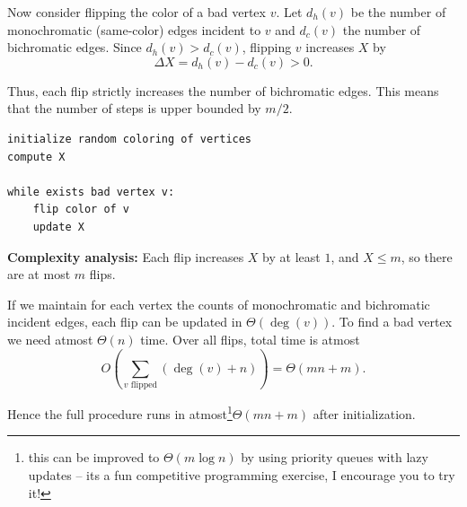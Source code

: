 Now consider flipping the color of a bad vertex $v$. Let $d_h(v)$ be the number of monochromatic (same-color) edges incident to $v$ and $d_c(v)$ the number of bichromatic edges. Since $d_h(v)>d_c(v)$, flipping $v$ increases $X$ by
\[
\Delta X = d_h(v)-d_c(v) > 0.
\]

Thus, each flip strictly increases the number of bichromatic edges. This means that the 
number of steps is upper bounded by $m/2$. 

\begin{center}
\begin{minipage}{0.9\linewidth}
\begin{framed}
\begin{Verbatim}
initialize random coloring of vertices
compute X

while exists bad vertex v:
    flip color of v
    update X
\end{Verbatim}
\vspace{-4mm}
\end{framed}
\end{minipage}
\end{center}


\noindent\textbf{Complexity analysis:}
Each flip increases $X$ by at least $1$, and $X \le m$, so there are at most $m$ flips.

If we maintain for each vertex the counts of monochromatic and bichromatic incident edges, each flip can be updated in $\Theta(\deg(v))$. To find a bad vertex we need atmost $\Theta(n)$ time. 
Over all flips, total time is atmost
\[
O\left(\sum_{v \text{ flipped}} \left(\deg(v) + n \right) \right) = \Theta(mn+m).
\]

Hence the full procedure runs in atmost\footnote{this can be improved to $\Theta(m\log n)$ by 
using priority queues with lazy updates -- its a fun competitive programming exercise, I encourage 
you to try it!}$\Theta(mn+m)$ after initialization.

